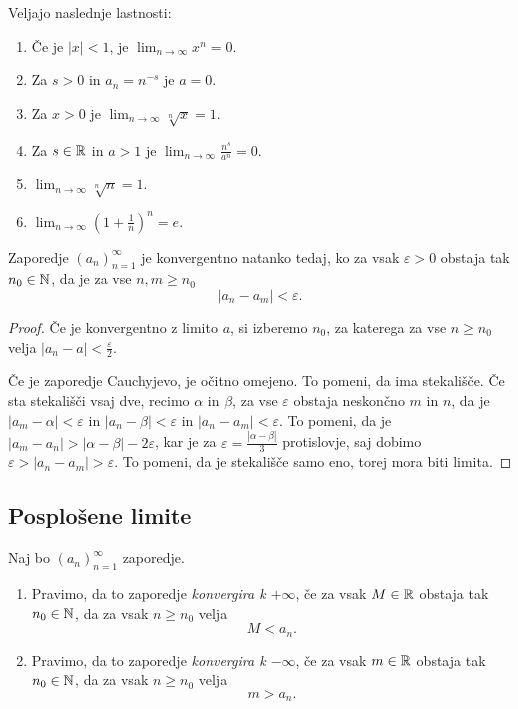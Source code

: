 \documentclass[12pt, a4paper]{article}
\begin{document}
\begin{posledica}
Veljajo naslednje lastnosti:

\begin{enumerate}[label=\arabic*)]
\item Če je $|x|<1$, je $\displaystyle\lim_{n\to\infty}x^n=0$.
\item Za $s>0$ in $a_n=n^{-s}$ je $a=0$.
\item Za $x>0$ je $\displaystyle\lim_{n\to\infty}\sqrt[n]{x}=1$.
\item Za $s\in\mathbb{R}$ in $a>1$ je $\displaystyle\lim_{n\to\infty}\frac{n^s}{a^n}=0$.
\item $\displaystyle\lim_{n\to\infty}\sqrt[n]{n}=1$.
\item $\displaystyle\lim_{n\to\infty}\left(1+\frac{1}{n}\right)^n=e$.
\end{enumerate}
\end{posledica}

\begin{izrek}
Zaporedje $(a_n)_{n=1}^\infty$ je konvergentno natanko tedaj, ko za vsak $\varepsilon>0$ obstaja tak $n_0\in\mathbb{N}$, da je za vse $n,m\geq n_0$
\[
|a_n-a_m|<\varepsilon.
\]
\end{izrek}

\begin{proof}
Če je konvergentno z limito $a$, si izberemo $n_0$, za katerega za vse $n\geq n_0$ velja $|a_n-a|<\frac{\varepsilon}{2}$.

Če je zaporedje Cauchyjevo, je očitno omejeno. To pomeni, da ima stekališče. Če sta stekališči vsaj dve, recimo $\alpha$ in $\beta$, za vse $\varepsilon$ obstaja neskončno $m$ in $n$, da je $|a_m-\alpha|<\varepsilon$ in $|a_n-\beta|<\varepsilon$ in $|a_n-a_m|<\varepsilon$. To pomeni, da je $|a_m-a_n|>|\alpha-\beta|-2\varepsilon$, kar je za $\varepsilon=\frac{|\alpha-\beta|}{3}$ protislovje, saj dobimo $\varepsilon>|a_n-a_m|>\varepsilon$. To pomeni, da je stekališče samo eno, torej mora biti limita.
\end{proof}

\newpage

\subsection{Posplošene limite}

\begin{definicija}
Naj bo $(a_n)_{n=1}^\infty$ zaporedje.

\begin{enumerate}[label=\arabic*)]
\item Pravimo, da to zaporedje \emph{konvergira k $+\infty$}, če za vsak $M\in\mathbb{R}$ obstaja tak $n_0\in\mathbb{N}$, da za vsak $n\geq n_0$ velja
\[
M<a_n.
\]
\item Pravimo, da to zaporedje \emph{konvergira k $-\infty$}, če za vsak $m\in\mathbb{R}$ obstaja tak $n_0\in\mathbb{N}$, da za vsak $n\geq n_0$ velja
\[
m>a_n.
\]
\end{enumerate}
\end{definicija}
\end{document}
